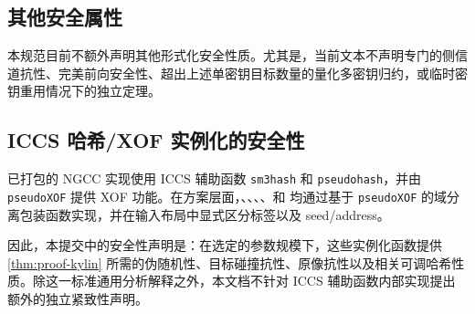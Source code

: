 \subsection{其他安全属性}
\label{sec:proof-other-properties}

本规范目前不额外声明其他形式化安全性质。尤其是，当前文本不声明专门的侧信道抗性、完美前向安全性、超出上述单密钥目标数量的量化多密钥归约，或临时密钥重用情况下的独立定理。

\subsection{ICCS 哈希/XOF 实例化的安全性}
\label{sec:proof-iccs-instantiation}

已打包的 NGCC 实现使用 ICCS 辅助函数 \texttt{sm3hash} 和 \texttt{pseudohash}，并由 \texttt{pseudoXOF} 提供 XOF 功能。在方案层面，\hashmsg、\PRF、\PRFmsg、\hashF、\hashH 和 \Th 均通过基于 \texttt{pseudoXOF} 的域分离包装函数实现，并在输入布局中显式区分标签以及 seed/address。

因此，本提交中的安全性声明是：在选定的参数规模下，这些实例化函数提供 \cref{thm:proof-kylin} 所需的伪随机性、目标碰撞抗性、原像抗性以及相关可调哈希性质。除这一标准通用分析解释之外，本文档不针对 ICCS 辅助函数内部实现提出额外的独立紧致性声明。
